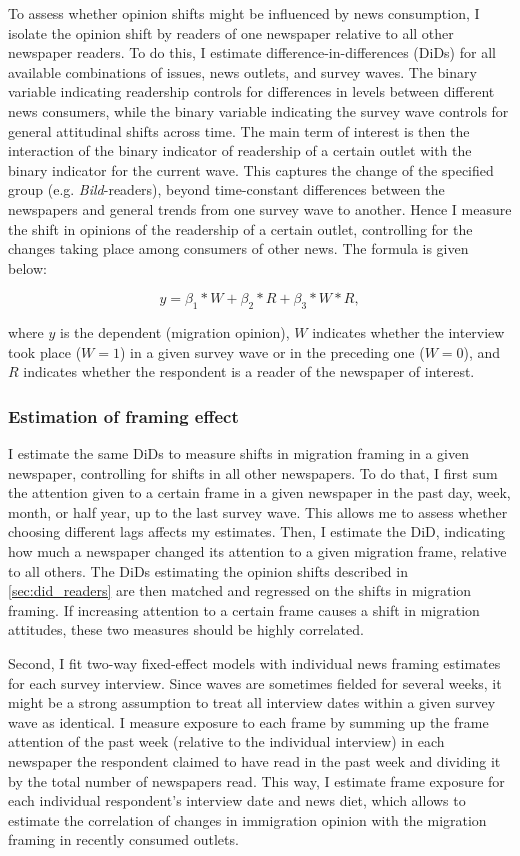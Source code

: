 \documentclass{article}
\begin{document}
To assess whether opinion shifts might be influenced by news consumption, I isolate the opinion shift by readers of one newspaper relative to all other newspaper readers. To do this, I estimate difference-in-differences (DiDs) for all available combinations of issues, news outlets, and survey waves. The binary variable indicating readership controls for differences in levels between different news consumers, while the binary variable indicating the survey wave controls for general attitudinal shifts across time. The main term of interest is then the interaction of the binary indicator of readership of a certain outlet with the binary indicator for the current wave. This captures the change of the specified group (e.g. \textit{Bild}-readers), beyond time-constant differences between the newspapers and general trends from one survey wave to another. Hence I measure the shift in opinions of the readership of a certain outlet, controlling for the changes taking place among consumers of other news. The formula is given below:

$$ y = \beta_1 * W + \beta_2 * R + \beta_3 * W * R, $$

where $y$ is the dependent (migration opinion), $W$ indicates whether the interview took place ($W = 1$) in a given survey wave or in the preceding one ($W = 0$), and $R$ indicates whether the respondent is a reader of the newspaper of interest.


\subsubsection{Estimation of framing effect}\label{sec:models}

I estimate the same DiDs to measure shifts in migration framing in a given newspaper, controlling for shifts in all other newspapers. To do that, I first sum the attention given to a certain frame in a given newspaper in the past day, week, month, or half year, up to the last survey wave. This allows me to assess whether choosing different lags affects my estimates. Then, I estimate the DiD, indicating how much a newspaper changed its attention to a given migration frame, relative to all others. The DiDs estimating the opinion shifts described in \ref{sec:did_readers} are then matched and regressed on the shifts in migration framing. If increasing attention to a certain frame causes a shift in migration attitudes, these two measures should be highly correlated.

Second, I fit two-way fixed-effect models with individual news framing estimates for each survey interview. Since waves are sometimes fielded for several weeks, it might be a strong assumption to treat all interview dates within a given survey wave as identical. I measure exposure to each frame by summing up the frame attention of the past week (relative to the individual interview) in each newspaper the respondent claimed to have read in the past week and dividing it by the total number of newspapers read. This way, I estimate frame exposure for each individual respondent's interview date and news diet, which allows to estimate the correlation of changes in immigration opinion with the migration framing in recently consumed outlets.
\end{document}
